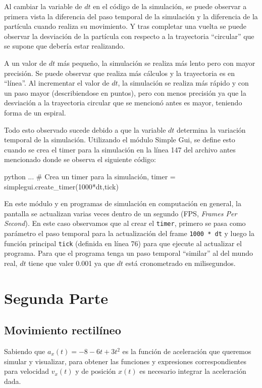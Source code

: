 \documentclass[12pt, a4paper]{article}
\begin{document}
\newpage
Al cambiar la variable de $dt$ en el código de la simulación, se puede observar a primera vista la diferencia del paso temporal de la simulación y la diferencia de la partícula cuando realiza su movimiento. Y tras completar una vuelta se puede observar la desviación de la partícula con respecto a la trayectoria “circular” que se supone que debería estar realizando.

A un valor de $dt$ más pequeño, la simulación se realiza más lento pero con mayor precisión. Se puede observar que realiza más cálculos y la trayectoria es en “línea”. 
Al incrementar el valor de $dt$, la simulación se realiza más rápido y con un paso mayor (describiendose en puntos), pero con menos precisión ya que la desviación a la trayectoria circular que se mencionó antes es mayor, teniendo forma de un espiral. 

Todo esto observado sucede debido a que la variable $dt$ determina la variación temporal de la simulación. Utilizando el módulo Simple Gui, se define esto cuando se crea el timer para la simulación en la línea 147 del archivo antes mencionado donde se observa el siguiente código:

\begin{mintedbox}{python}
...
# Crea un timer para la simulación,
timer = simplegui.create_timer(1000*dt,tick)
\end{mintedbox}


En este módulo y en programas de simulación en computación en general, la pantalla se actualizan varias veces dentro de un segundo (FPS, \textit{Frames Per Second}). En este caso observamos que al crear el \texttt{timer}, primero se pasa como parámetro el paso temporal para la actualización del frame \texttt{1000 * dt} y luego la función principal \texttt{tick} (definida en línea 76) para que ejecute al actualizar el programa. Para que el programa tenga un paso temporal “similar” al del mundo real, $dt$ tiene que valer 0.001 ya que $dt$ está cronometrado en milisegundos.


\newpage
\section{Segunda Parte}
\subsection{Movimiento rectilíneo}
Sabiendo que $a_x(t) = -8 - 6t + 3t^2$ es la función de aceleración que queremos simular y visualizar, para obtener las funciones y expresiones correspondientes para velocidad 
 $v_x(t)$ y de posición $x(t)$ es necesario integrar la aceleración dada. 
\end{document}
